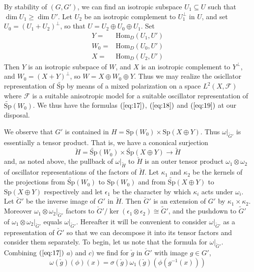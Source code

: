 \documentclass[12pt]{amsart}
\def\Sp{{\mathrm{Sp}}}
\def\tSp{{\widetilde{\mathrm{Sp}}}}
\def\Hom{{\mathrm{Hom}}}
\def\tG{{\widetilde{G}}}
\def\cG{{\check{G}}}
\def\cg{{\check{g}}}
\def\tH{{\widetilde{H}}}
\def\cH{{\check{H}}}
\def\kk{\kappa}
\def\cff{{\mathcal{F}}}
\begin{document}
By stability of $(G,G')$, we can find an isotropic subspace $U_1\subseteq U$
such that $\dim U_1 \geq \dim U'$. Let $U_2$ be an isotropic 
complement to $U_1^\perp$ in $U$, and set $U_0=(U_1+U_2)^\perp$, 
so that $U=U_2\oplus U_0 \oplus U_1$. Set
\begin{equation}\label{eq:24}
\begin{split}
Y =& \Hom_D(U_1,U')\\
W_0 =& \Hom_D(U_0,U')\\
X=& \Hom_D(U_2,U')
\end{split}
\end{equation}
Then $Y$ is an isotropic subspace of $W$, and $X$ is an isotropic complement 
to $Y^\perp$, and $W_0=(X+Y)^\perp$, so $W=X\oplus W_0\oplus Y$. Thus we may
realize the osicllator representation of $\tSp$ by means of a mixed 
polarization on a space $L^2(X,\cff)$ where $\cff$ is a suitable 
anisotropic model for a suitable oscillator representation of $\tSp(W_0)$. 
We thus have the formulas $(\ref{eq:17})$, $(\ref{eq:18})$ and $(\ref{eq:19})$
at our disposal.

We observe that $G'$ is contained in $H=\Sp(W_0)\times\Sp(X\oplus Y)$. 
Thus $\omega|_{\tG'}$ is essentially a tensor product. That is, 
we have a cononical surjection
\[
\cH = \tSp(W_0)\times \tSp(X\oplus Y) \to \tH
\]
and, as noted above, the pullback of $\omega|_\tH$ to $\cH$ is an 
outer tensor product $\omega_1\otimes \omega_2$ of oscillator 
representations of the factors of $\cH$. 
Let $\kk_1$ and $\kk_2$ be the kernels of the projections from
$\tSp(W_0)$ to $\Sp(W_0)$ and from $\tSp(X\oplus Y)$ to $\Sp(X\oplus Y)$
respectively and let $\epsilon_1$ be the character by which
$\kk_i$ acts under $\omega_i$. Let $\cG'$ be the inverse image of
$G'$ in $\cH$. Then $\cG'$ is an extension of $G'$ by $\kk_1\times \kk_2$. 
Moreover $\omega_1\otimes \omega_2|_{\cG'}$ factors to 
$\cG'/\ker(\epsilon_1\otimes \epsilon_2)\cong \tG'$, and 
the pushdown to $\tG'$ of $\omega_1\otimes \omega_2|_{\cG'}$ equals
$\omega|_{\tG'}$. Hereafter it will be convenient to consider $\omega|_{\tG'}$
as a representation of $\cG'$ so that we can decompose it into its tensor 
factors and consider them separately. 
To begin, let us note that the formula for $\omega|_{\cG'}$. Combining
$(\ref{eq:17})$  $a)$ and $c)$ we find for $\cg$ in $\cG'$ with 
image $g\in G'$,
\begin{equation}\label{eq:25}
\omega(\cg)(\phi)(x) = \sigma(\cg)\omega_1(\cg)(\phi(g^{-1}(x)))
\end{equation}
\end{document}
